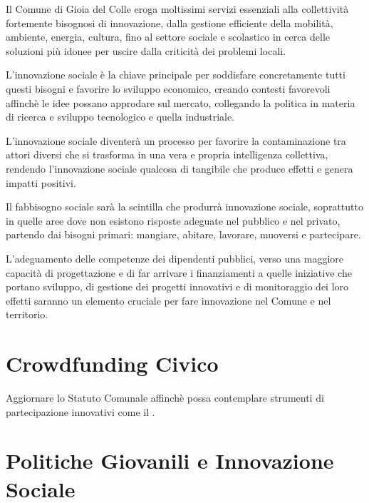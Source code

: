 \documentclass[a4paper,14pt,italian]{sphinxmanual}
\begin{document}
Il Comune di Gioia del Colle eroga moltissimi servizi essenziali alla collettività fortemente bisognosi di innovazione, dalla gestione efficiente della mobilità, ambiente, energia, cultura, fino al settore sociale e scolastico in cerca delle soluzioni più idonee per uscire dalla criticità dei problemi locali.

L’innovazione sociale è la chiave principale per soddisfare concretamente tutti questi bisogni e favorire lo sviluppo economico, creando contesti favorevoli affinchè le idee possano approdare sul mercato, collegando la politica in materia di ricerca e sviluppo tecnologico e quella industriale.

L’innovazione sociale diventerà un processo per favorire la contaminazione tra attori diversi che si trasforma in una vera e propria intelligenza collettiva, rendendo l’innovazione sociale qualcosa di tangibile che produce effetti e genera impatti positivi.

Il fabbisogno sociale sarà la scintilla che produrrà innovazione sociale, soprattutto in quelle aree dove non esistono risposte adeguate nel pubblico e nel privato, partendo dai bisogni primari: mangiare, abitare, lavorare, muoversi e partecipare.

L’adeguamento delle competenze dei dipendenti pubblici, verso una maggiore capacità di progettazione e di far arrivare i finanziamenti a quelle iniziative che portano sviluppo, di gestione dei progetti innovativi e di monitoraggio dei loro effetti saranno un elemento cruciale per fare innovazione nel Comune e nel territorio.


\section{Crowdfunding Civico}
\label{\detokenize{partecipazione:crowdfunding-civico}}
Aggiornare lo Statuto Comunale affinchè possa contemplare strumenti di partecipazione innovativi come il .


\section{Politiche Giovanili e Innovazione Sociale}
\label{\detokenize{partecipazione:politiche-giovanili-e-innovazione-sociale}}
\end{document}
